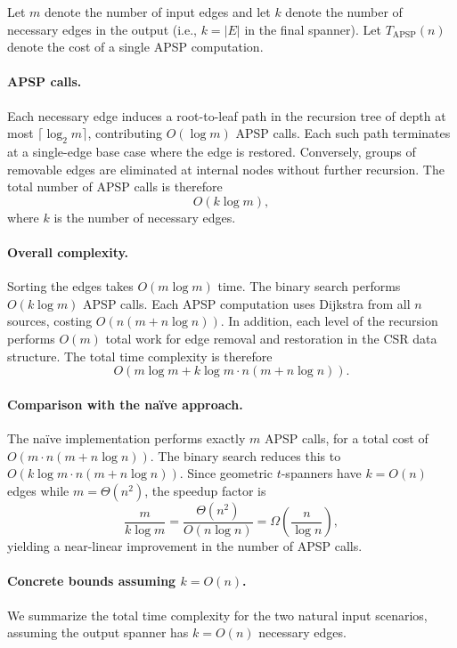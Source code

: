 \documentclass{article}
\begin{document}
Let $m$ denote the number of input edges and let $k$ denote the number of necessary edges in the output (i.e., $k = |E|$ in the final spanner). Let $T_{\mathrm{APSP}}(n)$ denote the cost of a single APSP computation.

\paragraph{APSP calls.}
Each necessary edge induces a root-to-leaf path in the recursion tree of depth at most $\lceil \log_2 m \rceil$, contributing $O(\log m)$ APSP calls. Each such path terminates at a single-edge base case where the edge is restored. Conversely, groups of removable edges are eliminated at internal nodes without further recursion. The total number of APSP calls is therefore
\[
    O(k \log m),
\]
where $k$ is the number of necessary edges.

\paragraph{Overall complexity.}
Sorting the edges takes $O(m \log m)$ time. The binary search performs $O(k \log m)$ APSP calls. Each APSP computation uses Dijkstra from all $n$ sources, costing $O(n(m + n \log n))$. In addition, each level of the recursion performs $O(m)$ total work for edge removal and restoration in the CSR data structure. The total time complexity is therefore
\[
    O\!\left(m \log m + k \log m \cdot n(m + n \log n)\right).
\]

\paragraph{Comparison with the na\"ive approach.}
The na\"ive implementation performs exactly $m$ APSP calls, for a total cost of $O(m \cdot n(m + n \log n))$. The binary search reduces this to $O(k \log m \cdot n(m + n \log n))$. Since geometric $t$-spanners have $k = O(n)$ edges while $m = \Theta(n^2)$, the speedup factor is
\[
    \frac{m}{k \log m} = \frac{\Theta(n^2)}{O(n \log n)} = \Omega\!\left(\frac{n}{\log n}\right),
\]
yielding a near-linear improvement in the number of APSP calls.

\paragraph{Concrete bounds assuming $k = O(n)$.}
We summarize the total time complexity for the two natural input scenarios, assuming the output spanner has $k = O(n)$ necessary edges.
\end{document}
